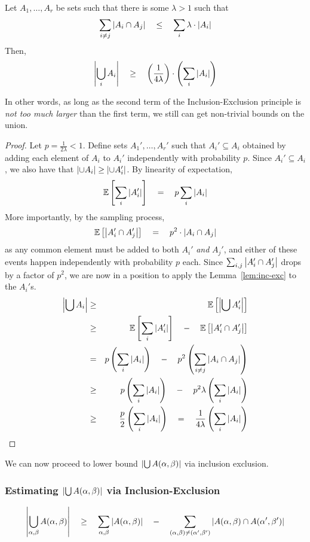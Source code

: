 \documentclass[12pt]{report}
\begin{document}
\begin{lemma}\label{lem:str-inc-exc}
Let $A_1,\dots, A_r$ be sets such that there is some $\lambda > 1$ such that
\[
\sum_{i\neq j} \left|A_i \cap A_j\right| \quad \leq \quad \sum_i \lambda \cdot \left|A_i\right|
\]
Then, 
\[
\left|\bigcup_i A_i\right| \quad \geq \quad \left(\frac{1}{4\lambda}\right) \cdot \left(\sum_i \left|A_i\right|\right)
\]
\end{lemma}

In other words, as long as the second term of the Inclusion-Exclusion principle is \emph{not too much larger} than the first term, we still can get non-trivial bounds on the union. 

\begin{proof}
Let $p = \frac{1}{2\lambda} < 1$. Define sets $A_1',\dots, A_r'$ such that $A_i' \subseteq A_i$ obtained by adding each element of $A_i$ to $A_i'$ independently with probability $p$. Since $A_i' \subseteq A_i$, we also have that $\left|\cup A_i\right| \geq \left|\cup  A_i'\right|$. By linearity of expectation, 
\[
\mathbb{E}\left[\sum_i \left|A_i'\right|\right] \quad = \quad p \sum_{i} \left|A_i\right| 
\]
More importantly, by the sampling process,
\[
\mathbb{E}\left[\left|A_i' \cap A_j'\right|\right] \quad = \quad p^2 \cdot \left|A_i \cap A_j\right|
\]
as any common element must be added to both $A_i'$ \emph{and} $A_j'$, and either of these events happen independently with probability $p$ each. Since $\sum_{i,j}\left|A_i' \cap A_j'\right|$ drops by a factor of $p^2$, we are now in a position to apply the Lemma~\ref{lem:inc-exc} to the $A_i'$s. 
\begin{eqnarray*}
\left|\bigcup A_i\right| & \geq &  \mathbb{E}\left[\left|\bigcup A_i'\right|\right]\\
& \geq & \mathbb{E}\left[\sum_i \left|A_i'\right|\right] \quad - \quad \mathbb{E}\left[\left|A_i' \cap A_j'\right|\right]\\
& = & p \left(\sum_i \left|A_i\right|\right) \quad - \quad p^2\left(\sum_{i\neq j}\left|A_i \cap A_j\right|\right)\\
& \geq & p \left(\sum_i \left|A_i\right|\right) \quad - \quad p^2 \lambda \left(\sum_i \left|A_i\right|\right)\\
& \geq & \frac{p}{2} \left(\sum_i \left|A_i\right|\right) \quad = \quad \frac{1}{4\lambda} \left(\sum_i \left|A_i\right|\right)
\end{eqnarray*}
\end{proof}

We can now proceed to lower bound $\left|\bigcup A(\alpha, \beta)\right|$ via inclusion exclusion.

\subsubsection*{Estimating $\left|\bigcup A(\alpha, \beta)\right|$ via Inclusion-Exclusion}
\[
\left|\bigcup_{\alpha, \beta}A(\alpha,\beta)\right|\quad \geq \quad \sum_{\alpha,\beta}\left|A(\alpha, \beta)\right| \quad - \quad \sum_{(\alpha, \beta)\neq (\alpha',\beta')}\left|A(\alpha, \beta) \cap A(\alpha',\beta')\right|
\]
\end{document}

